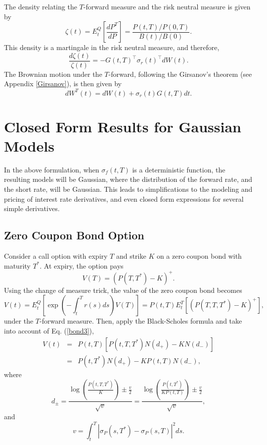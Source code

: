 \documentclass[12pt]{article}
\begin{document}
  The density relating the $T$-forward measure and the risk neutral measure is given by
  \begin{equation}
    \zeta(t)=E_t^Q\left[\frac{dP^T}{dP}\right]=\frac{P(t,T)/P(0,T)}{B(t)/B(0)}.
  \end{equation}
  This density is a martingale in the risk neutral measure, and therefore,
  \begin{equation}
    \frac{d\zeta(t)}{\zeta(t)}=-G(t,T)^{\top}\sigma_r(t)^{\top}dW(t).
  \end{equation}
  The Brownian motion under the $T$-forward, following the Girsanov's theorem (see Appendix \ref{Girsanov}), is then given by
  \begin{equation}
    dW^T(t)=dW(t)+\sigma_r(t)G(t,T)dt.
    \label{Tmeasure}
  \end{equation}


\section{Closed Form Results for Gaussian Models}

  In the above formulation, when $\sigma_f(t,T)$ is a deterministic function,
  the resulting models will be Gaussian, where the distribution of the forward rate, and the short rate, will be Gaussian.
  This leads to simplifications to the modeling and pricing of interest rate derivatives, and even closed form expressions
  for several simple derivatives.

  \subsection{Zero Coupon Bond Option}

    Consider a call option with expiry $T$ and strike $K$ on a zero coupon bond with maturity $T^*$. At expiry, the
    option pays
    \begin{equation}
      V(T)=\left(P(T,T^*)-K\right)^+.
    \end{equation}
    Using the change of measure trick, the value of the zero coupon bond becomes
    \begin{equation}
      V(t)=E_t^Q\left[\exp\left(-\int_t^Tr(s)ds\right)V(T)\right]=P(t,T)E_t^T\left[\left(P(T,T,T^*)-K\right)^+\right],
    \end{equation}
    under the $T$-forward measure. Then, apply the Black-Scholes formula and take into account of Eq. (\ref{bond3}),
    \begin{eqnarray}
      V(t) &=& P(t,T)\left[P(t,T,T^*)N(d_+)-KN(d_-)\right] \nonumber\\
           &=& P(t,T^*)N(d_+) - KP(t,T)N(d_-),
      \label{zcbo}
    \end{eqnarray}
    where
    \begin{equation}
      d_{\pm} = \frac{\displaystyle\log\left(\frac{P(t,T,T^*)}{K}\right)\pm \frac{v}{2}}{\sqrt{v}}
             = \frac{\displaystyle\log\left(\frac{P(t,T^*)}{KP(t,T)}\right)\pm \frac{v}{2}}{\sqrt{v}},
    \end{equation}
    and
    \begin{equation}
      v=\int_t^T\left|\sigma_P(s,T^*)-\sigma_P(s,T)\right|^2ds.
    \end{equation}
\end{document}
